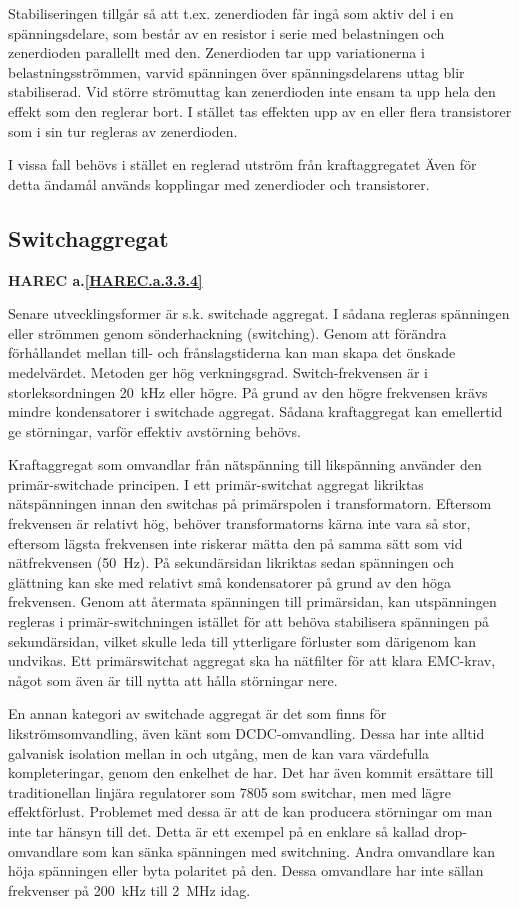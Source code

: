 Stabiliseringen tillgår så att t.ex. zenerdioden får ingå som aktiv
del i en spänningsdelare, som består av en resistor i serie med
belastningen och zenerdioden parallellt med den. Zenerdioden tar upp
variationerna i belastningsströmmen, varvid spänningen över
spänningsdelarens uttag blir stabiliserad. Vid större strömuttag kan
zenerdioden inte ensam ta upp hela den effekt som den reglerar bort. I
stället tas effekten upp av en eller flera transistorer som i sin tur
regleras av zenerdioden.

I vissa fall behövs i stället en reglerad utström från kraftaggregatet
Även för detta ändamål används kopplingar med zenerdioder och
transistorer.

\subsection{Switchaggregat}
\textbf{HAREC a.\ref{HAREC.a.3.3.4}\label{myHAREC.a.3.3.4}}

Senare utvecklingsformer är s.k. switchade aggregat. I sådana regleras
spänningen eller strömmen genom sönderhackning (switching). Genom att
förändra förhållandet mellan till- och frånslagstiderna kan man skapa
det önskade medelvärdet. Metoden ger hög verkningsgrad.
Switch-frekvensen är i storleksordningen 20~kHz eller högre.
På grund av den högre frekvensen krävs mindre kondensatorer i
switchade aggregat. Sådana kraftaggregat kan emellertid ge störningar,
varför effektiv avstörning behövs.

Kraftaggregat som omvandlar från nätspänning till likspänning använder
den primär-switchade principen. I ett primär-switchat aggregat likriktas
nätspänningen innan den switchas på primärspolen i transformatorn.
Eftersom frekvensen är relativt hög, behöver transformatorns kärna inte
vara så stor, eftersom lägsta frekvensen inte riskerar mätta den på samma
sätt som vid nätfrekvensen (50~Hz). På sekundärsidan likriktas sedan
spänningen och glättning kan ske med relativt små kondensatorer på grund
av den höga frekvensen. Genom att återmata spänningen till primärsidan, kan
utspänningen regleras i primär-switchningen istället för att behöva
stabilisera spänningen på sekundärsidan, vilket skulle leda till ytterligare
förluster som därigenom kan undvikas. Ett primärswitchat aggregat ska ha
nätfilter för att klara EMC-krav, något som även är till nytta att hålla
störningar nere.

En annan kategori av switchade aggregat är det som finns för
likströmsomvandling, även känt som DCDC-omvandling. Dessa har inte alltid
galvanisk isolation mellan in och utgång, men de kan vara värdefulla
kompleteringar, genom den enkelhet de har. Det har även kommit ersättare till
traditionellan linjära regulatorer som 7805 som switchar, men med lägre
effektförlust. Problemet med dessa är att de kan producera störningar om man
inte tar hänsyn till det. Detta är ett exempel på en enklare så kallad
drop-omvandlare som kan sänka spänningen med switchning. Andra omvandlare kan
höja spänningen eller byta polaritet på den. Dessa omvandlare har inte sällan
frekvenser på 200~kHz till 2~MHz idag.

